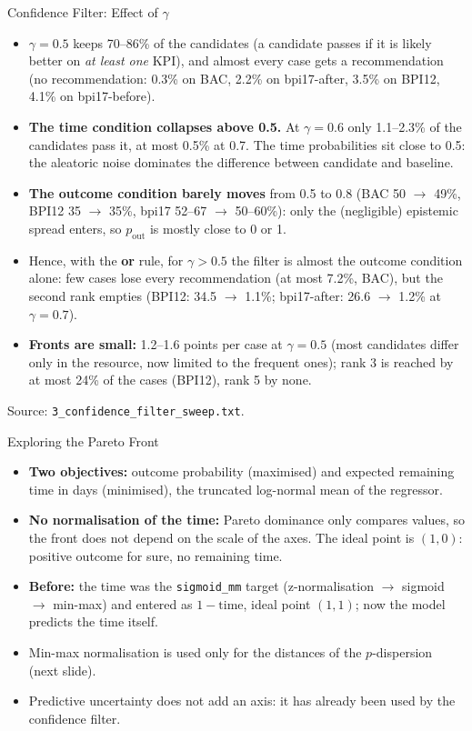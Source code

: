 \documentclass[aspectratio=169]{beamer} %
\begin{document}
\begin{frame}{Confidence Filter: Effect of $\gamma$}
  \footnotesize
  \begin{itemize}
    \item \textbf{$\gamma = 0.5$} keeps 70--86\% of the candidates (a candidate passes if it is likely better on
      \emph{at least one} KPI), and almost every case gets a recommendation (no recommendation: 0.3\% on BAC,
      2.2\% on bpi17-after, 3.5\% on BPI12, 4.1\% on bpi17-before).
    \item \textbf{The time condition collapses above 0.5.} At $\gamma = 0.6$ only 1.1--2.3\% of the candidates
      pass it, at most 0.5\% at 0.7. The time probabilities sit close to 0.5: the aleatoric noise dominates the
      difference between candidate and baseline.
    \item \textbf{The outcome condition barely moves} from 0.5 to 0.8 (BAC 50 $\rightarrow$ 49\%, BPI12
      35 $\rightarrow$ 35\%, bpi17 52--67 $\rightarrow$ 50--60\%): only the (negligible) epistemic spread enters,
      so $p_{\text{out}}$ is mostly close to 0 or 1.
    \item Hence, with the \textbf{or} rule, for $\gamma > 0.5$ the filter is almost the outcome condition alone:
      few cases lose every recommendation (at most 7.2\%, BAC), but the second rank empties
      (BPI12: 34.5 $\rightarrow$ 1.1\%; bpi17-after: 26.6 $\rightarrow$ 1.2\% at $\gamma = 0.7$).
    \item \textbf{Fronts are small:} 1.2--1.6 points per case at $\gamma = 0.5$ (most candidates differ only in the
      resource, now limited to the frequent ones); rank 3 is reached by at most 24\% of the cases (BPI12), rank 5
      by none.
  \end{itemize}
  {\scriptsize Source: \texttt{3\_confidence\_filter\_sweep.txt}.}
\end{frame}

\begin{frame}{Exploring the Pareto Front}
    \begin{itemize}
        \item \textbf{Two objectives:} outcome probability (\alert{maximised}) and expected remaining time in
          days (\alert{minimised}), the truncated log-normal mean of the regressor.
        \item \textbf{No normalisation of the time:} Pareto dominance only compares values, so the front
          does not depend on the scale of the axes. The ideal point is $(1, 0)$: positive outcome
          for sure, no remaining time.
        \item \textbf{Before:} the time was the \texttt{sigmoid\_mm} target (z-normalisation $\rightarrow$
          sigmoid $\rightarrow$ min-max) and entered as $1 - \text{time}$, ideal point $(1,1)$; now the
          model predicts the time itself.
        \item Min-max normalisation is used only for the distances of the $p$-dispersion (next slide).
        \item Predictive uncertainty does not add an axis: it has already been used by
          the confidence filter.
    \end{itemize}
\end{frame}
\end{document}
